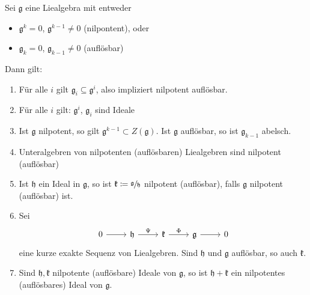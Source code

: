 \begin{lemma}[label=lem:213]
	Sei $\mathfrak{g}$ eine Liealgebra mit entweder 
	\begin{itemize}
		\item $\mathfrak{g}^k=0$, $\mathfrak{g}^{k-1} \neq 0$ (nilpontent), oder
		\item $\mathfrak{g}_k=0$, $\mathfrak{g}_{k-1} \neq 0$ (auflösbar)
	\end{itemize}
	Dann gilt:
	\begin{enumerate}[1)]
		\item Für alle $i$ gilt $\mathfrak{g}_i \subseteq \mathfrak{g}^i$, also impliziert nilpotent auflösbar.
		\item Für alle $i$ gilt: $\mathfrak{g}^i$, $\mathfrak{g}_i$ sind Ideale
		\item Ist $\mathfrak{g}$ nilpotent, so gilt $\mathfrak{g}^{k-1} \subset Z(\mathfrak{g})$.
		Ist $\mathfrak{g}$ auflösbar, so ist $\mathfrak{g}_{k-1}$ abelsch.
		\item Unteralgebren von nilpotenten (auflösbaren) Liealgebren sind nilpotent (auflösbar)
		\item Ist $\mathfrak{h}$ ein Ideal in $\mathfrak{g}$, so ist $\mathfrak{k} \coloneqq \sfrac{\mathfrak{g}}{\mathfrak{h}}$ nilpotent (auflösbar), falls $\mathfrak{g}$ nilpotent (auflösbar) ist.
		\item Sei 
		\[
			\begin{tikzcd}
				0 \rar & \mathfrak{h} \rar["\Psi"] & \mathfrak{k} \rar["\Phi"] & \mathfrak{g} \rar & 0
			\end{tikzcd}
		\]
		eine kurze exakte Sequenz von Liealgebren.
		Sind $\mathfrak{h}$ und $\mathfrak{g}$ auflösbar, so auch $\mathfrak{k}$.
		\item Sind $\mathfrak{h}, \mathfrak{k}$ nilpotente (auflösbare) Ideale von $\mathfrak{g}$, so ist $\mathfrak{h} + \mathfrak{k}$ ein nilpotentes (auflösbares) Ideal von $\mathfrak{g}$.
	\end{enumerate}
\end{lemma}

